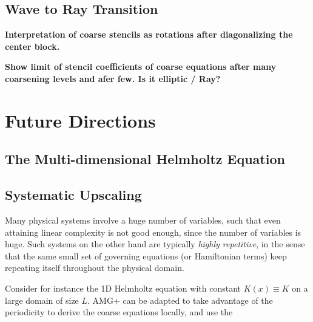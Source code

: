 \documentclass{article}
\begin{document}
\subsection{Wave to Ray Transition}
{\bf Interpretation of coarse stencils as rotations after diagonalizing the center block.}

{\bf Show limit of stencil coefficients of coarse equations after many coarsening levels and afer few. Is it elliptic / Ray?}

\section{Future Directions}
\label{future}

\subsection{The Multi-dimensional Helmholtz Equation}
\label{multidim}

\subsection{Systematic Upscaling}
\label{upscaling}
Many physical systems involve a huge number of variables, such that even attaining linear complexity is not good enough, since the number of variables is huge. Such systems on the other hand are typically \emph{highly repetitive}, in the sense that the same small set of governing equations (or Hamiltonian terms) keep repeating itself throughout the physical domain. 

Consider for instance the 1D Helmholtz equation with constant $K(x) \equiv K$ on a large domain of size $L$. AMG+ can be adapted to take advantage of the periodicity to derive the coarse equations locally, and use the 
\end{document}
